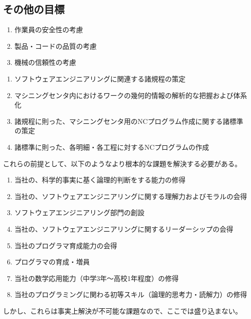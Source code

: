 \subsection{その他の目標}
\begin{enumerate}[label=\sarrow]
\item 作業員の安全性の考慮
\item 製品・コードの品質の考慮
\item 機械の信頼性の考慮
\end{enumerate}



\clearpage
\begin{enumerate}[label=\sarrow]
\item ソフトウェアエンジニアリングに関連する諸規程の策定
\item マシニングセンタ内におけるワークの幾何的情報の解析的な把握および体系化
\item 諸規程に則った、マシニングセンタ用のNCプログラム作成に関する諸標準の策定
\item 諸標準に則った、各明細・各工程に対するNCプログラムの作成
\end{enumerate}
\begin{hosoku}
これらの前提として、以下のようなより根本的な課題を解決する必要がある。
\begin{enumerate}[label=\sarrow]
\item[{\sarrow[red]}] 当社の、科学的事実に基く論理的判断をする能力の修得
\item[{\sarrow[red]}] 当社の、ソフトウェアエンジニアリングに関する理解力およびモラルの会得
\item[{\sarrow[red]}] ソフトウェアエンジニアリング部門の創設
\item[{\sarrow[red]}] 当社の、ソフトウェアエンジニアリングに関するリーダーシップの会得
\item[{\sarrow[red]}] 当社のプログラマ育成能力の会得
\item[{\sarrow[red]}] プログラマの育成・増員
\item[{\sarrow[red]}] 当社の数学応用能力（中学3年～高校1年程度）の修得
\item[{\sarrow[red]}] 当社のプログラミングに関わる初等スキル（論理的思考力・読解力）の修得
\end{enumerate}
しかし、これらは事実上解決が不可能な課題なので、ここでは盛り込まない。
\end{hosoku}


